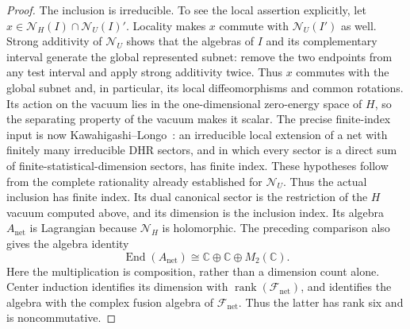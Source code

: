 \begin{proof}
The inclusion is irreducible.  To see the local assertion explicitly,
let $x\in\mathcal N_H(I)\cap\mathcal N_U(I)'$.  Locality makes $x$
commute with $\mathcal N_U(I')$ as well.  Strong additivity of
$\mathcal N_U$ shows that the algebras of $I$ and its complementary
interval generate the global represented subnet: remove the two
endpoints from any test interval and apply strong additivity twice.
Thus $x$ commutes with the global subnet and, in particular, its local
diffeomorphisms and common rotations.  Its action on the vacuum lies
in the one-dimensional zero-energy space of $H$, so the separating
property of the vacuum makes it scalar.  The precise finite-index
input is now
Kawahigashi--Longo~\cite[Proposition~2.3]{KL}: an irreducible local extension
of a net with finitely many irreducible DHR sectors, and in which every
sector is a direct sum of finite-statistical-dimension sectors, has
finite index.  These hypotheses follow
from the complete rationality already established for $\mathcal N_U$.
Thus the actual inclusion has finite index.  Its dual canonical sector
is the restriction of the $H$ vacuum computed above, and its dimension
is the inclusion index.  Its algebra $A_{\mathrm{net}}$ is Lagrangian because
$\mathcal N_H$ is holomorphic.  The preceding comparison also gives
the algebra identity
\begin{equation}
 \operatorname{End}(A_{\mathrm{net}})
 \cong\mathbb C\oplus\mathbb C\oplus M_2(\mathbb C).
 \label{eq:analytic-end-algebra}
\end{equation}
Here the multiplication is composition, rather than a dimension count
alone.  Center induction identifies its dimension with
$\operatorname{rank}(\mathcal F_{\mathrm{net}})$, and identifies the
algebra with the complex fusion algebra of
$\mathcal F_{\mathrm{net}}$.  Thus the latter has rank six and is
noncommutative.


\end{proof}
